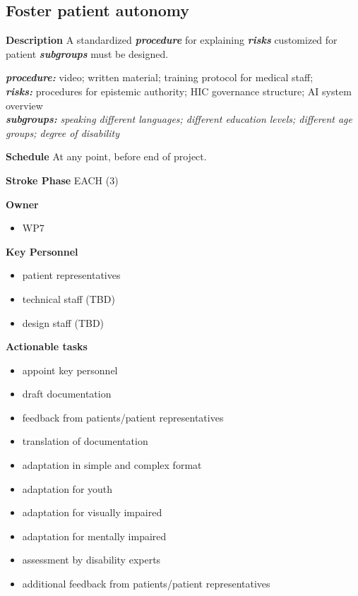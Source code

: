 \documentclass[
  letterpaper,
  DIV=11,
  numbers=noendperiod]{scrreport}
\providecommand{\tightlist}{%
  \setlength{\itemsep}{0pt}\setlength{\parskip}{0pt}}\usepackage{longtable,booktabs,array}
\begin{document}
\hypertarget{foster-patient-autonomy}{%
\subsection{Foster patient autonomy}\label{foster-patient-autonomy}}

\textbf{Description} A standardized \textbf{\emph{procedure}} for
explaining \textbf{\emph{risks}} customized for patient
\textbf{\emph{subgroups}} must be designed.

\textbf{\emph{procedure:}} video; written material; training protocol
for medical staff;\\
\textbf{\emph{risks:}} procedures for epistemic authority; HIC
governance structure; AI system overview\\
\textbf{\emph{subgroups:}} \emph{speaking different languages; different
education levels; different age groups; degree of disability}

\textbf{Schedule} At any point, before end of project.

\textbf{Stroke Phase} EACH (3)

\textbf{Owner}

\begin{itemize}
\tightlist
\item
  WP7
\end{itemize}

\textbf{Key Personnel}

\begin{itemize}
\tightlist
\item
  patient representatives
\item
  technical staff (TBD)
\item
  design staff (TBD)
\end{itemize}

\textbf{Actionable tasks}

\begin{itemize}
\tightlist
\item
  appoint key personnel
\item
  draft documentation
\item
  feedback from patients/patient representatives
\item
  translation of documentation
\item
  adaptation in simple and complex format
\item
  adaptation for youth
\item
  adaptation for visually impaired
\item
  adaptation for mentally impaired
\item
  assessment by disability experts
\item
  additional feedback from patients/patient representatives
\end{itemize}
\end{document}
